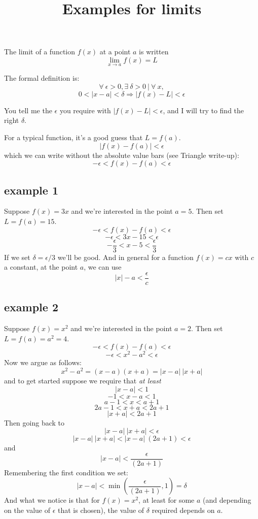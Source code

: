 \documentclass[11pt, oneside]{article}
\title{Examples for limits}
\date{}
\begin{document}
\maketitle
\Large
The limit of a function $f(x)$ at a point $a$ is written
\[ \lim_{x \rightarrow a} f(x) = L \]

The formal definition is:
\[  \forall \ \epsilon > 0, \exists \ \delta > 0 \ | \ \forall \ x, \]
\[ 0 < | x - a| < \delta \Rightarrow | f(x) - L | < \epsilon \]

You tell me the $\epsilon$ you require with $| f(x) - L | < \epsilon$, and I will try to find the right $\delta$.

For a typical function, it's a good guess that $L = f(a)$.
\[ | f(x) - f(a) | < \epsilon \]
which we can write without the absolute value bars (see Triangle write-up):
\[ -\epsilon <  f(x) - f(a) < \epsilon \]

\subsection*{example 1}
Suppose $f(x) = 3x$ and we're interested in the point $a = 5$.  Then set $L = f(a) = 15$.
\[ -\epsilon <  f(x) - f(a) < \epsilon \]
\[ -\epsilon <  3x - 15 < \epsilon \]
\[ - \frac{\epsilon}{3} <  x - 5 < \frac{\epsilon}{3} \]
If we set $\delta = \epsilon/3$ we'll be good.  And in general for a function $f(x) = cx$ with $c$ a constant, at the point $a$, we can use
\[ | x | - a <  \frac{\epsilon}{c} \]

\subsection*{example 2}
Suppose $f(x) = x^2$ and we're interested in the point $a = 2$.  Then set $L = f(a) = a^2 = 4$.
\[ -\epsilon <  f(x) - f(a) < \epsilon \]
\[ -\epsilon <  x^2 - a^2 < \epsilon \]
Now we argue as follows:
\[ x^2 - a^2 = (x - a)(x + a) = |x-a| \ |x + a| \]
and to get started suppose we require that \emph{at least}
\[ | x - a | < 1 \]
\[ -1 < x - a < 1 \]
\[ a - 1 < x < a + 1 \]
\[ 2a - 1 < x + a < 2a + 1 \]
\[ |x + a| < 2a + 1 \]
Then going back to 
\[ |x-a| \ |x + a| < \epsilon \]
\[ |x-a| \ |x + a| < |x - a| \ (2a + 1) < \epsilon \]
and
\[ |x - a| < \frac{\epsilon}{(2a + 1)} \]
Remembering the first condition we set:
\[ |x - a| < \min ( \frac{\epsilon}{(2a + 1)}, 1) = \delta \]
And what we notice is that for $f(x) = x^2$, at least for some $a$ (and depending on the value of $\epsilon$ that is chosen), the value of $\delta$ required depends on $a$.
\end{document}
